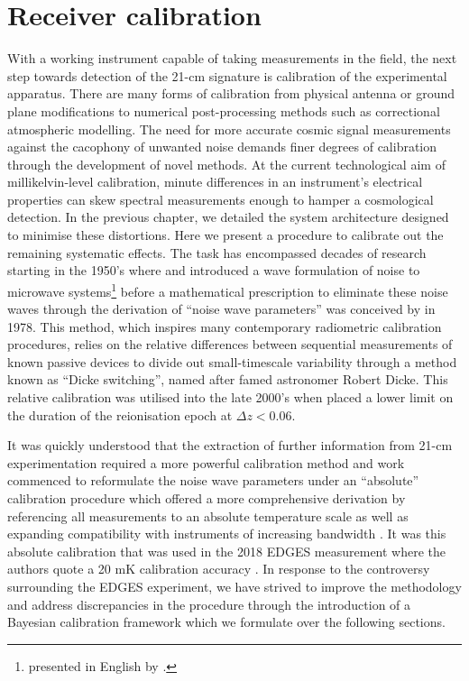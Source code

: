 \chapter{Receiver calibration}\label{chap:calibration}

\ifpdf
    \graphicspath{{calibration/figs/Raster/}{calibration/figs/PDF/}{calibration/figs/}}
\else
    \graphicspath{{calibration/figs/Vector/}{calibration/figs/}}
\fi


With a working instrument capable of taking measurements in the field, the next step towards detection of the 21-cm signature is calibration of the experimental apparatus. There are many forms of calibration from physical antenna or ground plane modifications to numerical post-processing methods such as correctional atmospheric modelling. The need for more accurate cosmic signal measurements against the cacophony of unwanted noise demands finer degrees of calibration through the development of novel methods. At the current technological aim of millikelvin-level calibration, minute differences in an instrument’s electrical properties can skew spectral measurements enough to hamper a cosmological detection. In the previous chapter, we detailed the system architecture designed to minimise these distortions. Here we present a procedure to calibrate out the remaining systematic effects. The task has encompassed decades of research starting in the 1950’s where \citet{bauer_rothe} and \citet{rothe_dahlke} introduced a wave formulation of noise to microwave systems\footnote{\citet{bauer_rothe} presented in English by \citet{penfield}.} before a mathematical prescription to eliminate these noise waves through the derivation of “noise wave parameters” was conceived by \citet{meys} in 1978. This method, which inspires many contemporary radiometric calibration procedures, relies on the relative differences between sequential measurements of known passive devices to divide out small-timescale variability through a method known as “Dicke switching”, named after famed astronomer Robert Dicke. This relative calibration was utilised into the late 2000’s when \citet{edges_limits} placed a lower limit on the duration of the reionisation epoch at $\Delta z < 0.06$.

It was quickly understood that the extraction of further information from 21-cm experimentation required a more powerful calibration method and work commenced to reformulate the noise wave parameters under an “absolute” calibration procedure which offered a more comprehensive derivation by referencing all measurements to an absolute temperature scale as well as expanding compatibility with instruments of increasing bandwidth \citep{rogersCal}. It was this absolute calibration that was used in the 2018 EDGES measurement where the authors quote a 20 mK calibration accuracy \citep{edgesNature, edgesCal}. In response to the controversy surrounding the EDGES experiment, we have strived to improve the methodology and address discrepancies in the procedure through the introduction of a Bayesian calibration framework which we formulate over the following sections.


